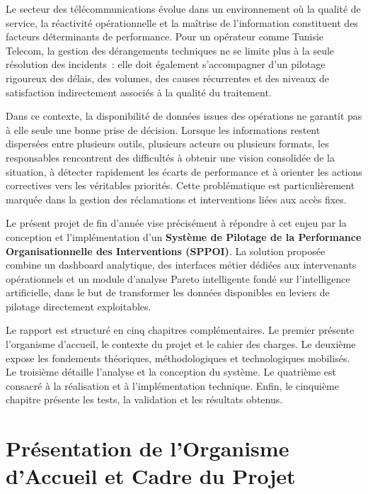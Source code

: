 \documentclass[10pt,a4paper]{report}
\begin{document}
Le secteur des télécommunications évolue dans un environnement où la qualité de service, la réactivité opérationnelle et la maîtrise de l'information constituent des facteurs déterminants de performance. Pour un opérateur comme Tunisie Telecom, la gestion des dérangements techniques ne se limite plus à la seule résolution des incidents~: elle doit également s'accompagner d'un pilotage rigoureux des délais, des volumes, des causes récurrentes et des niveaux de satisfaction indirectement associés à la qualité du traitement.

Dans ce contexte, la disponibilité de données issues des opérations ne garantit pas à elle seule une bonne prise de décision. Lorsque les informations restent dispersées entre plusieurs outils, plusieurs acteurs ou plusieurs formats, les responsables rencontrent des difficultés à obtenir une vision consolidée de la situation, à détecter rapidement les écarts de performance et à orienter les actions correctives vers les véritables priorités. Cette problématique est particulièrement marquée dans la gestion des réclamations et interventions liées aux accès fixes.

Le présent projet de fin d'année vise précisément à répondre à cet enjeu par la conception et l'implémentation d'un \textbf{Système de Pilotage de la Performance Organisationnelle des Interventions (SPPOI)}. La solution proposée combine un dashboard analytique, des interfaces métier dédiées aux intervenants opérationnels et un module d'analyse Pareto intelligente fondé sur l'intelligence artificielle, dans le but de transformer les données disponibles en leviers de pilotage directement exploitables.

Le rapport est structuré en cinq chapitres complémentaires. Le premier présente l'organisme d'accueil, le contexte du projet et le cahier des charges. Le deuxième expose les fondements théoriques, méthodologiques et technologiques mobilisés. Le troisième détaille l'analyse et la conception du système. Le quatrième est consacré à la réalisation et à l'implémentation technique. Enfin, le cinquième chapitre présente les tests, la validation et les résultats obtenus.

\chapter{Présentation de l'Organisme d'Accueil et Cadre du Projet}
\end{document}
